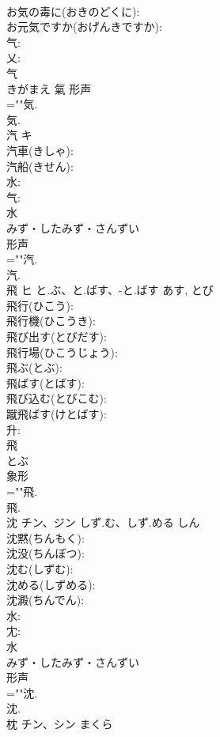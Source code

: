 \documentclass[8pt]{extreport}
\begin{document}
\begin{CJK}{UTF8}{min}
\\	お気の毒に(おきのどくに): 
\\	お元気ですか(おげんきですか): 
\\	气: 
\\	乂: 
\\	气	
\\	きがまえ	氣	形声 
\\	=""気.
\\	気.
\\	汽	キ			
\\	汽車(きしゃ): 
\\	汽船(きせん): 
\\	水: 
\\	气: 
\\	水	
\\	みず・したみず・さんずい	
\\	形声 
\\	=""汽.
\\	汽.
\\	飛	ヒ	と.ぶ、と.ばす、-と.ばす	あす, とび	
\\	飛行(ひこう): 
\\	飛行機(ひこうき): 
\\	飛び出す(とびだす): 
\\	飛行場(ひこうじょう): 
\\	飛ぶ(とぶ): 
\\	飛ばす(とばす): 
\\	飛び込む(とびこむ): 
\\	蹴飛ばす(けとばす): 
\\	升: 
\\	飛	
\\	とぶ	
\\	象形 
\\	=""飛.
\\	飛.
\\	沈	チン、ジン	しず.む、しず.める	しん	
\\	沈黙(ちんもく): 
\\	沈没(ちんぼつ): 
\\	沈む(しずむ): 
\\	沈める(しずめる): 
\\	沈澱(ちんでん): 
\\	水: 
\\	冘: 
\\	水	
\\	みず・したみず・さんずい	
\\	形声 
\\	=""沈.
\\	沈.
\\	枕	チン、シン	まくら		

\end{CJK}
\end{document}
